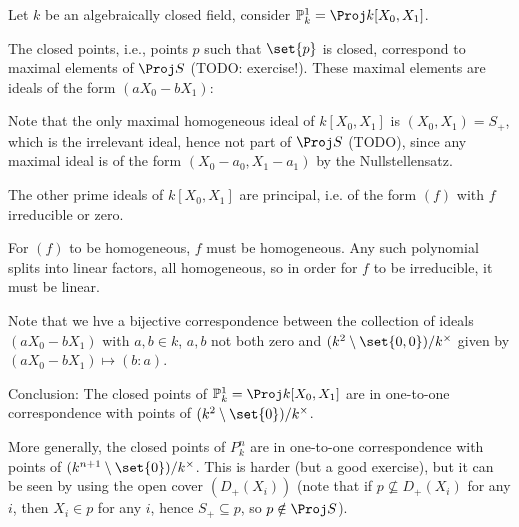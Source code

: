 Let $k$ be an algebraically closed field, consider $\mathbb{P}_k^1 = \Proj k[X_0, X_1]$.

The closed points, i.e., points $p$ such that $\set{p}$ is closed, correspond to
maximal elements of $\Proj S$ (TODO: exercise!). These maximal elements are ideals
of the form $(aX_0 - bX_1)$:

Note that the only maximal homogeneous ideal of $k[X_0, X_1]$ is $(X_0, X_1) = S_+$,
which is the irrelevant ideal, hence not part of $\Proj S$ (TODO), since
any maximal ideal is of the form $(X_0 - a_0, X_1 - a_1)$ by the Nullstellensatz.

The other prime ideals of $k[X_0, X_1]$ are principal, i.e. of the form
$(f)$ with $f$ irreducible or zero.

For $(f)$ to be homogeneous, $f$ must be homogeneous. Any such polynomial splits
into linear factors, all homogeneous, so in order for $f$ to be irreducible,
it must be linear.

Note that we hve a bijective correspondence between the collection of ideals
$(aX_0 - bX_1)$ with $a, b \in k$, $a, b$ not both zero and
$(k^2\setminus\set{0, 0})/k^\times$ given by $(aX_0 - bX_1)\mapsto (b : a)$.

Conclusion: The closed points of $\mathbb{P}^1_k = \Proj k[X_0, X_1]$ are in one-to-one correspondence
with points of $(k^2\setminus\set{0})/k^\times$.

More generally, the closed points of $P^n_k$ are in one-to-one correspondence with
points of $(k^{n+1}\setminus\set{0})/k^\times$. This is harder (but a good exercise), but it can be seen
by using the open cover $(D_+(X_i))$ (note that if $p \nsubseteq D_+(X_i)$ for any $i$,
then $X_i \in p$ for any $i$, hence $S_+ \subseteq p$, so $p\notin \Proj S$).
